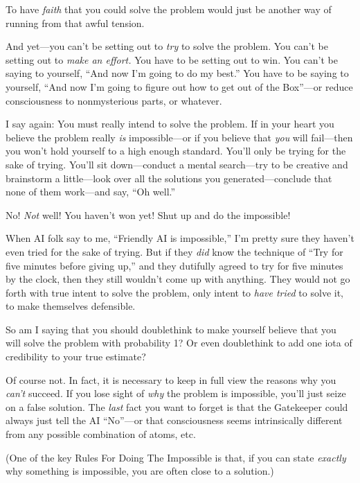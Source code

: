 {
 To have \textit{faith} that you could solve the problem would just
be another way of running from that awful tension.}

{
 And yet---you can't be setting out to \textit{try}
to solve the problem. You can't be setting out to
\textit{make an effort.} You have to be setting out to win. You
can't be saying to yourself, ``And now
I'm going to do my best.'' You have
to be saying to yourself, ``And now
I'm going to figure out how to get out of the
Box''---or reduce consciousness to nonmysterious
parts, or whatever.}

{
 I say again: You must really intend to solve the problem. If in
your heart you believe the problem really \textit{is} impossible---or
if you believe that \textit{you} will fail---then you
won't hold yourself to a high enough standard.
You'll only be trying for the sake of trying.
You'll sit down---conduct a mental search---try to be
creative and brainstorm a little---look over all the solutions you
generated---conclude that none of them work---and say,
``Oh well.''}

{
 No! \textit{Not} well! You haven't won yet! Shut
up and do the impossible!}

{
 When AI folk say to me, ``Friendly AI is
impossible,'' I'm pretty sure they
haven't even tried for the sake of trying. But if they
\textit{did} know the technique of ``Try for five
minutes before giving up,'' and they dutifully agreed
to try for five minutes by the clock, then they still
wouldn't come up with anything. They would not go forth
with true intent to solve the problem, only intent to \textit{have
tried} to solve it, to make themselves defensible.}

{
 So am I saying that you should doublethink to make yourself
believe that you will solve the problem with probability 1? Or even
doublethink to add one iota of credibility to your true estimate?}

{
 Of course not. In fact, it is necessary to keep in full view the
reasons why you \textit{can't} succeed. If you lose
sight of \textit{why} the problem is impossible, you'll
just seize on a false solution. The \textit{last} fact you want to
forget is that the Gatekeeper could always just tell the AI
``No''---or that consciousness seems
intrinsically different from any possible combination of atoms, etc.}

{
 (One of the key Rules For Doing The Impossible is that, if you can
state \textit{exactly} why something is impossible, you are often close
to a solution.)}

